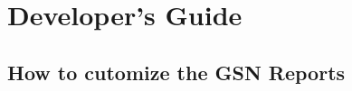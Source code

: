 \graphicspath{{chapters/ch-developer-guide/figures/}}

\chapter{Developer's Guide}






\section{How to cutomize the GSN Reports}